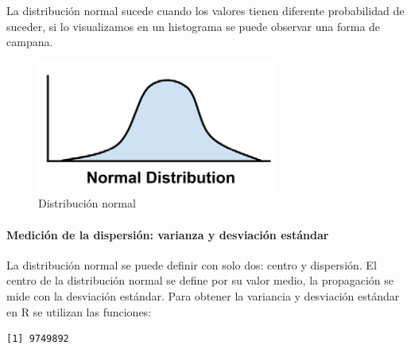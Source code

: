 \documentclass[
  letterpaper,
  DIV=11,
  numbers=noendperiod]{scrartcl}
\let\oldparagraph\paragraph
\renewcommand{\paragraph}[1]{\oldparagraph{#1}\mbox{}}
\newenvironment{Shaded}{\begin{snugshade}}{\end{snugshade}}
\newcommand{\CommentTok}[1]{\textcolor[rgb]{0.37,0.37,0.37}{#1}}
\newcommand{\FunctionTok}[1]{\textcolor[rgb]{0.28,0.35,0.67}{#1}}
\newcommand{\NormalTok}[1]{\textcolor[rgb]{0.00,0.23,0.31}{#1}}
\newcommand{\SpecialCharTok}[1]{\textcolor[rgb]{0.37,0.37,0.37}{#1}}
\begin{document}
La distribución normal sucede cuando los valores tienen diferente
probabilidad de suceder, si lo visualizamos en un histograma se puede
observar una forma de campana.

\begin{figure}

{\centering \includegraphics{normal.png}

}

\caption{Distribución normal}

\end{figure}

\hypertarget{mediciuxf3n-de-la-dispersiuxf3n-varianza-y-desviaciuxf3n-estuxe1ndar}{%
\paragraph{Medición de la dispersión: varianza y desviación
estándar}\label{mediciuxf3n-de-la-dispersiuxf3n-varianza-y-desviaciuxf3n-estuxe1ndar}}

La distribución normal se puede definir con solo dos: centro y
dispersión. El centro de la distribución normal se define por su valor
medio, la propagación se mide con la desviación estándar. Para obtener
la variancia y desviación estándar en R se utilizan las funciones:

\begin{Shaded}
\end{Shaded}

\begin{verbatim}
[1] 9749892
\end{verbatim}

\begin{Shaded}
\end{Shaded}
\end{document}
